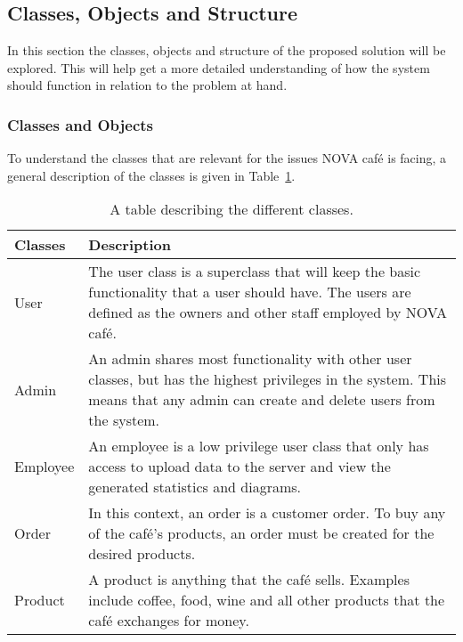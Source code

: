 \subsection{Classes, Objects and Structure}\label{subsec:classes-objects-and-structure}

In this section the classes, objects and structure of the proposed solution will be explored.
This will help get a more detailed understanding of how the system should function in relation to the problem at hand.

\subsubsection{Classes and Objects}\label{subsubsec:classes-and-objects}

To understand the classes that are relevant for the issues NOVA café is facing,
a general description of the classes is given in Table~\ref{tab:class-table}.

\begin{table}[H]
    \begin{tabularx}{\textwidth}{ l X }
        \toprule
        \textbf{Classes}
        & \textbf{Description}
        \\ \midrule
        User
        & The user class is a superclass that will keep the
        basic functionality that a user should have.
        The users are defined as the owners and other staff employed by NOVA café.
        \\ \midrule
        Admin
        & An admin shares most functionality with other user classes,
        but has the highest privileges in the system.
        This means that any admin can create and delete users from the system.
        \\ \midrule
        Employee
        & An employee is a low privilege user class
        that only has access to upload data to the server and
        view the generated statistics and diagrams.
        \\ \midrule
        Order
        & In this context, an order is a customer order.
        To buy any of the café's products, an order must be created
        for the desired products.
        \\ \midrule
        Product
        & A product is anything that the café sells.
        Examples include coffee, food, wine and all other products that
        the café exchanges for money.
        \\ \bottomrule
    \end{tabularx}
    \caption{A table describing the different classes.
    }\label{tab:class-table}
\end{table}

